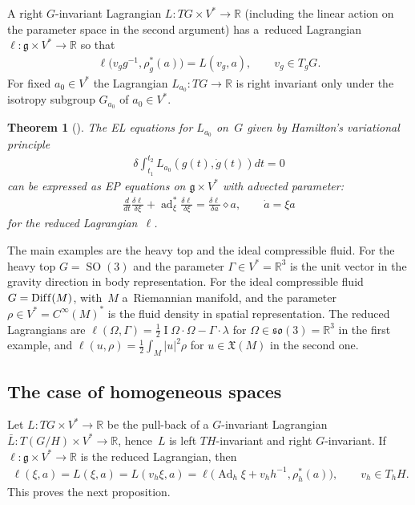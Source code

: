 \documentclass[10pt,a4paper]{amsart}
\numberwithin{equation}{section}
\newtheorem{Theorem}{Theorem}[section]
\begin{document}
A right $G$-invariant Lagrangian $L:TG\times V^*\rightarrow\mathbb{R}$ (including the linear action on the parameter
space in the second argument) has a~reduced Lagrangian {$\ell:\mathfrak{g}\times V^*\rightarrow\mathbb{R}$} so that
\begin{gather*}
\ell\big(v_gg^{-1},\rho^*_{g}(a)\big)=L(v_g,a),
\qquad
v_g\in T_gG.
\end{gather*}
For f\/ixed $a_0\in V^*$ the Lagrangian $L_{a_0}:TG\rightarrow\mathbb{R}$ is right invariant only under the isotropy
subgroup $G_{a_0}$ of $a_0\in V^*$.

\begin{Theorem}[\cite{CHMR}]
\label{lini}
The EL equations for $L_{a_0}$ on~$G$ given by Hamilton's variational principle
\begin{gather*}
\delta\int_{t_1}^{t_2}L_{a_0}(g(t),\dot{g}(t))dt=0
\end{gather*}
can be expressed as EP equations on $\mathfrak g\times V^*$ with advected parameter:
\begin{gather}
\label{rightep}
{\frac{d}{dt}\frac{\delta\ell}{\delta\xi}+\operatorname{ad}^*_\xi\frac{\delta \ell}{\delta\xi}=\frac{\delta\ell}{\delta
a}\diamond a},
\qquad
\dot{a}=\xi a
\end{gather}
for the reduced Lagrangian~$\ell$.
\end{Theorem}

The main examples are the heavy top and the ideal compressible f\/luid.
For the heavy top $G=\operatorname{SO}(3)$ and the parameter $\Gamma\in V^*=\mathbb R^3$ is the unit vector in the
gravity direction in body representation.
For the ideal compressible f\/luid $G=\operatorname{Dif\/f}(M)$, with~$M$ a~Riemannian manifold, and the parameter $\rho\in
V^*= C^{\infty}(M)^*$ is the f\/luid density in spatial representation.
The reduced Lagrangians are $\ell(\Omega,\Gamma)=\frac12 \operatorname{I}\Omega\cdot\Omega-\Gamma\cdot\lambda$ for
$\Omega\in\mathfrak{so}(3)=\mathbb R^3$ in the f\/irst example, and $\ell(u,\rho)=\frac12\int_M|u|^2\rho$ for
$u\in\mathfrak X(M)$ in the second one.



\subsection{The case of homogeneous spaces}

Let $L:TG\times V^*\to\mathbb R$ be the pull-back of a $G$-invariant Lagrangian $\bar L:T(G/H)\times V^*\to\mathbb R$,
hence~$L$ is left $TH$-invariant and right $G$-invariant.
If $\ell:\mathfrak g\times V^*\to\mathbb R$ is the reduced Lagrangian, then
\begin{gather*}
\ell(\xi,a)=L(\xi,a)=L(v_h\xi,a) =\ell\big({\operatorname{Ad}_h\xi}+v_hh^{-1},\rho^*_{h}(a)\big),
\qquad
v_h\in T_hH.
\end{gather*}
This proves the next proposition.
\end{document}
